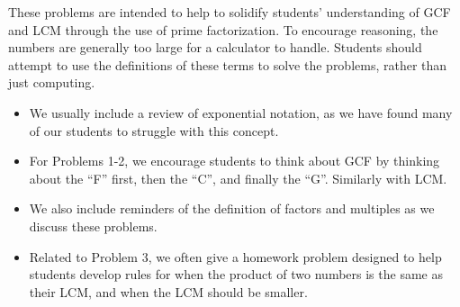 \documentclass[nooutcomes,nooutcomes,handout]{ximera}
\begin{document}
\begin{instructorNotes}
These problems are intended to help to solidify students' understanding of GCF and LCM through the use of prime factorization.  To encourage reasoning, the numbers are generally too large for a calculator to handle.  Students should attempt to use the definitions of these terms to solve the problems, rather than just computing.

\begin{itemize}
    \item We usually include a review of exponential notation, as we have found many of our students to struggle with this concept.
	\item For Problems 1-2, we encourage students to think about GCF by thinking about the ``F'' first, then the ``C'', and finally the ``G''.  Similarly with LCM.
	\item We also include reminders of the definition of factors and multiples as we discuss these problems.
	\item Related to Problem 3, we often give a homework problem designed to help students develop rules for when the product of two numbers is the same as their LCM, and when the LCM should be smaller. %
\end{itemize}

\end{instructorNotes}
\end{document}
